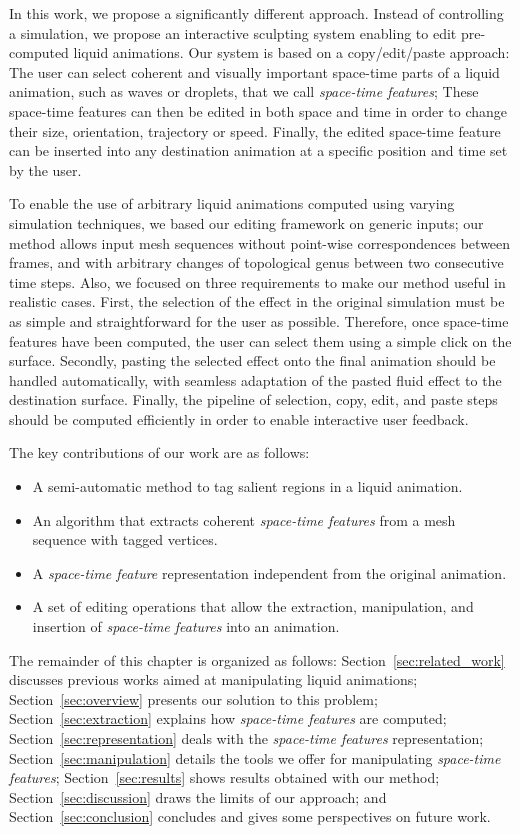 In this work, we propose a significantly different approach. 
Instead of controlling a simulation, we propose an interactive sculpting system enabling to edit pre-computed liquid animations.
Our system is based on a copy/edit/paste approach:
The user can select coherent and visually important space-time parts of a liquid animation, such as waves or droplets, that we call \emph{space-time features};
These space-time features can then be edited in both space and time in order to change their size, orientation, trajectory or speed. 
Finally, the edited space-time feature can be inserted into any destination animation at a specific position and time set by the user.

To enable the use of arbitrary liquid animations computed using varying simulation techniques, we based our editing framework on generic inputs; our method allows input mesh sequences without point-wise correspondences between frames, and with arbitrary changes of topological genus between two consecutive time steps. 
Also, we focused on three requirements to make our method useful in realistic cases.
First, the selection of the effect in the original simulation must be as simple and straightforward for the user as possible. 
Therefore, once space-time features have been computed, the user can select them using a simple click on the surface.
Secondly, pasting the selected effect onto the final animation should be handled automatically, with seamless adaptation of the pasted fluid effect to the destination surface. 
Finally, the pipeline of selection, copy, edit, and paste steps should be computed efficiently in order to enable interactive user feedback. 

The key contributions of our work are as follows:
\begin{itemize}
    \item A semi-automatic method to tag salient regions in a liquid animation.
    \item An algorithm that extracts coherent \emph{space-time features} from a mesh sequence with tagged vertices.
    \item A \emph{space-time feature} representation independent from the original animation.
    \item A set of editing operations that allow the extraction, manipulation, and insertion of \emph{space-time features} into an animation.
\end{itemize}

The remainder of this chapter is organized as follows:
Section~\ref{sec:related_work} discusses previous works aimed at manipulating liquid animations;
Section~\ref{sec:overview} presents our solution to this problem;
Section~\ref{sec:extraction} explains how \emph{space-time features} are computed; 
Section~\ref{sec:representation} deals with the \emph{space-time features} representation; 
Section~\ref{sec:manipulation} details the tools we offer for manipulating \emph{space-time features}; 
Section~\ref{sec:results} shows results obtained with our method; 
Section~\ref{sec:discussion} draws the limits of our approach; 
and Section~\ref{sec:conclusion} concludes and gives some perspectives on future work.

